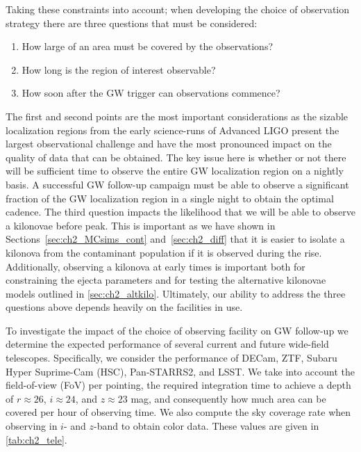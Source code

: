 Taking these constraints into account; when developing the choice of observation strategy there are three questions that must be considered:
\begin{enumerate}
\item How large of an area must be covered by the observations?
\item How long is the region of interest observable?
\item How soon after the GW trigger can observations commence?
\end{enumerate}

The first and second points are the most important considerations as the sizable localization regions from the early science-runs of Advanced LIGO present the largest observational challenge and have the most pronounced impact on the quality of data that can be obtained. The key issue here is whether or not there will be sufficient time to observe the entire GW localization region on a nightly basis. A successful GW follow-up campaign must be able to observe a significant fraction of the GW localization region in a single night to obtain the optimal cadence. The third question impacts the likelihood that we will be able to observe a kilonovae before peak. This is important as we have shown in Sections~\ref{sec:ch2_MCsims_cont} and~\ref{sec:ch2_diff} that it is easier to isolate a kilonova from the contaminant population if it is observed during the rise. Additionally, observing a kilonova at early times is important both for constraining the ejecta parameters and for testing the alternative kilonovae models outlined in \autoref{sec:ch2_altkilo}. Ultimately, our ability to address the three questions above depends heavily on the facilities in use.

To investigate the impact of the choice of observing facility on GW follow-up we determine the expected performance of several current and future wide-field telescopes. Specifically, we consider the performance of DECam, ZTF, Subaru Hyper Suprime-Cam (HSC), Pan-STARRS2, and LSST. We take into account the field-of-view (FoV) per pointing, the required integration time to achieve a depth of $r\approx26$, $i\approx24$, and $z\approx23$ mag, and consequently how much area can be covered per hour of observing time. We also compute the sky coverage rate when observing in $i$- and $z$-band to obtain color data. These values are given in \autoref{tab:ch2_tele}.

